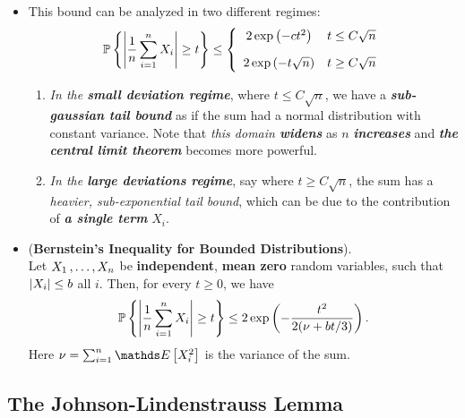 \documentclass[11pt]{article}
\begin{document}
\begin{itemize}
\item \begin{remark} This bound can be analyzed in two different regimes:
\begin{align*}
{\mathbb P}\left\{\left\lvert \frac{1}{n}\sum_{i=1}^{n}X_i \right\rvert \ge t\right\} \le \left\{\begin{array}{cc}
2 \exp\left(- c t^2\right) &  t\le C \sqrt{n}\\[10pt]
2 \exp\left(-  t\sqrt{n}\right) &  t\ge C \sqrt{n}
\end{array} 
\right. 
\end{align*} 
\begin{enumerate}
\item \emph{In the \textbf{small deviation regime}}, where $t\le C \sqrt{n}$, we have a \emph{\textbf{sub-gaussian tail bound}} as if the sum had a normal distribution with constant variance. Note that \emph{this domain \textbf{widens}} as $n$ \emph{\textbf{increases}} and \emph{\textbf{the central limit theorem}} becomes more powerful. 

\item \emph{In the \textbf{large deviations regime}}, say where $t\ge C \sqrt{n}$, the sum has a \emph{heavier, sub-exponential tail bound}, which can be due to the contribution of \emph{\textbf{a single term}} $X_i$. 
\end{enumerate}
\end{remark}

\item \begin{proposition} (\textbf{Bernstein's Inequality for Bounded Distributions}).  \citep{vershynin2018high}\\
Let $X_1 \,{,}\ldots{,}\, X_n$ be \textbf{independent}, \textbf{mean zero} random variables, such that $\left\lvert X_i \right\rvert \le b$ all $i$. Then, for every $t \ge 0$, we have
\begin{align}
{\mathbb P}\left\{\left\lvert \frac{1}{n}\sum_{i=1}^{n}X_i \right\rvert \ge t\right\} \le 2\exp\left(- \frac{t^2}{2(\nu + bt/3)}\right). \label{ineqn: bernstein_inequality_bounded}
\end{align}
Here $\nu = \sum_{i=1}^{n}\E{}{X_i^2}$ is the variance of the sum.
\end{proposition}


\end{itemize}

\subsection{The Johnson-Lindenstrauss Lemma}


\newpage


\end{document}

